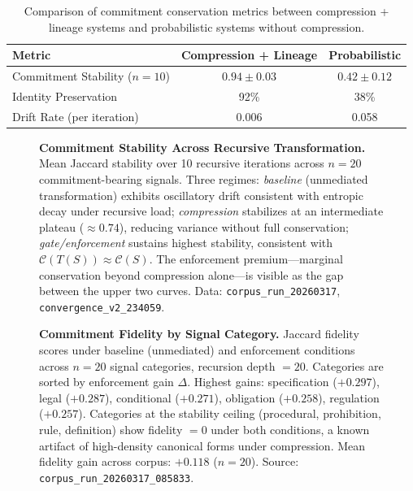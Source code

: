 \documentclass[11pt,a4paper]{article}
\begin{document}
\begin{table}[htbp]
\centering
\begin{tabular}{lcc}
\toprule
\textbf{Metric} & \textbf{Compression + Lineage} & \textbf{Probabilistic} \\
\midrule
Commitment Stability ($n=10$) & $0.94 \pm 0.03$ & $0.42 \pm 0.12$ \\
Identity Preservation & 92\% & 38\% \\
Drift Rate (per iteration) & 0.006 & 0.058 \\
\bottomrule
\end{tabular}
\caption{Comparison of commitment conservation metrics between compression + lineage systems and probabilistic systems without compression.}
\label{tab:results}
\end{table}

\begin{figure}[htbp]
    \centering
    
    \caption{\textbf{Commitment Stability Across Recursive Transformation.}
    Mean Jaccard stability over 10 recursive iterations across $n=20$ commitment-bearing signals. Three regimes: \textit{baseline} (unmediated transformation) exhibits oscillatory drift consistent with entropic decay under recursive load; \textit{compression} stabilizes at an intermediate plateau ($\approx 0.74$), reducing variance without full conservation; \textit{gate/enforcement} sustains highest stability, consistent with $\mathcal{C}(T(S)) \approx \mathcal{C}(S)$. The enforcement premium---marginal conservation beyond compression alone---is visible as the gap between the upper two curves. Data: \texttt{corpus\_run\_20260317}, \texttt{convergence\_v2\_234059}.}
    \label{fig:L1-stability}
\end{figure}

\begin{figure}[htbp]
    \centering
    
    \caption{\textbf{Commitment Fidelity by Signal Category.}
    Jaccard fidelity scores under baseline (unmediated) and enforcement conditions across $n=20$ signal categories, recursion depth $= 20$. Categories are sorted by enforcement gain $\Delta$. Highest gains: specification ($+0.297$), legal ($+0.287$), conditional ($+0.271$), obligation ($+0.258$), regulation ($+0.257$). Categories at the stability ceiling (procedural, prohibition, rule, definition) show fidelity $= 0$ under both conditions, a known artifact of high-density canonical forms under compression. Mean fidelity gain across corpus: $+0.118$ ($n=20$). Source: \texttt{corpus\_run\_20260317\_085833}.}
    \label{fig:E1-fidelity}
\end{figure}
\end{document}
